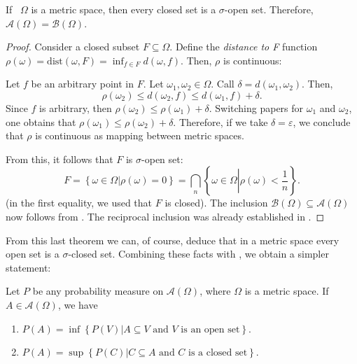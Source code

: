 \begin{prop}\label{proposition:Baire and Borel sets coincide in metric spaces}
If ~\(\Omega\) is a metric space, then every closed set is a \(\sigma\)-open set. Therefore, \(\mathcal{A}(\Omega)=\mathscr{B}\left(\Omega\right)\).
\end{prop}
\begin{proof}
		Consider a closed subset \(F\subseteq\Omega\). Define the \emph{distance to F} function  \(\rho(\omega)=\text{dist}(\omega,F)=\inf_{f\in F}d(\omega,f)\). Then, \(\rho\) is continuous:

		Let \(f\) be an arbitrary point in \(F\). Let \(\omega_1,\omega_2\in\Omega\). Call \(\delta=d(\omega_1,\omega_2)\). Then,
		\[
				\rho(\omega_2)\leq d(\omega_2,f)\leq d(\omega_1,f)+\delta
		.\]
		Since \(f\) is arbitrary, then \(\rho(\omega_2)\leq\rho(\omega_1)+\delta\). Switching papers for \(\omega_1\) and \(\omega_2\), one obtains that \(\rho(\omega_1)\leq\rho(\omega_2)+\delta\). Therefore, if we take \(\delta=\varepsilon\), we conclude that \(\rho\) is continuous as mapping between metric spaces.

		From this, it follows that \(F\) is \(\sigma\)-open set:
		\[
				F=\left\{\omega\in\Omega\left|\rho(\omega)=0\right.\right\}=\bigcap_{n}\left\{\omega\in\Omega\left|\rho(\omega)<\frac{1}{n}\right.\right\}
		.\]
(in the first equality, we used that \(F\) is closed). The inclusion  \(\mathscr{B}\left(\Omega\right)\subseteq\mathcal{A}(\Omega)\) now follows from . The reciprocal inclusion was already established in .
\end{proof}

From this last theorem we can, of course, deduce that in a metric space every open set is a \(\sigma\)-closed set. Combining these facts with , we obtain a simpler statement:

\begin{corl}\label{corollary:basic approximation, metric}
		Let \(P\) be any probability measure on \(\mathcal{A}(\Omega)\), where \(\Omega\) is a metric space. If \(A\in \mathcal{A}(\Omega)\), we have
		\begin{enumerate}
		\item\label{corollary:basic approximation, metric 1}
 \(P(A)=\inf\left\{P(V)\left|A\subseteq V \text{ and } V \text{ is an open set}\right.\right\}\).
		\item\label{corollary:basic approximation, metric 2}
 \(P(A)=\sup\left\{P(C)\left|C\subseteq A \text{ and } C \text{ is a closed set}\right.\right\}\).
		\end{enumerate}
\end{corl}

